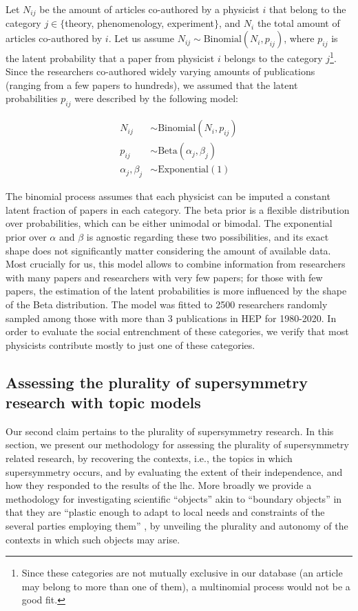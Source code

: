 \documentclass[smallextended]{svjour3}
\begin{document}
Let $N_{ij}$ be the amount of articles co-authored by a physicist $i$ that belong to the category $j \in \{$theory, phenomenology, experiment$\}$, and $N_i$ the total amount of articles co-authored by $i$. Let us assume $N_{ij} \sim \mathrm{Binomial}(N_i, p_{ij})$, where $p_{ij}$ is the latent probability that a paper from physicist $i$ belongs to the category $j$\footnote{Since these categories are not mutually exclusive in our database (an article may belong to more than one of them), a multinomial process would not be a good fit.}. Since the researchers co-authored widely varying amounts of publications (ranging from a few papers to hundreds), we assumed that the latent probabilities $p_{ij}$ were described by the following model:

\begin{align*}
    N_{ij} &\sim \mathrm{Binomial}(N_i, p_{ij})\\
    p_{ij} &\sim \mathrm{Beta}(\alpha_j, \beta_j) \\
    \alpha_j,\beta_j &\sim \mathrm{Exponential}(1)
\end{align*}

The binomial process assumes that each physicist can be imputed a constant latent fraction of papers in each category. The beta prior is a flexible distribution over probabilities, which can be either unimodal or bimodal. The exponential prior over $\alpha$ and $\beta$ is agnostic regarding these two possibilities, and its exact shape does not significantly matter considering the amount of available data. Most crucially for us, this model allows to combine information from researchers with many papers and researchers with very few papers; for those with few papers, the estimation of the latent probabilities is more influenced by the shape of the Beta distribution. The model was fitted to 2500 researchers randomly sampled among those with more than 3 publications in HEP for 1980-2020. In order to evaluate the social entrenchment of these categories, we verify that most physicists contribute mostly to just one of these categories.

\subsection{Assessing the plurality of supersymmetry research with topic models}\label{section:method_plurality}

Our second claim pertains to the plurality of supersymmetry research. In this section, we present our methodology for assessing the plurality of supersymmetry related research, by recovering the contexts, i.e., the topics in which supersymmetry occurs, and by evaluating the extent of their independence, and how they responded to the results of the \gls{lhc}. More broadly we provide a methodology for investigating scientific ``objects'' akin to ``boundary objects'' in that they are ``plastic enough to adapt to local needs and constraints of the several parties employing them'' \citep[p.~393]{Star1989}, by unveiling the plurality and autonomy of the contexts in which such objects may arise.
\end{document}
